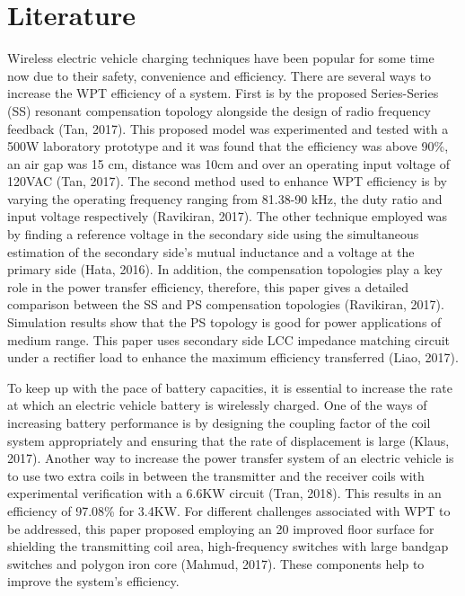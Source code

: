 \documentclass[12pt]{article}
\begin{document}
\section{Literature}
Wireless electric vehicle charging techniques have been popular for some time now due to their
safety, convenience and efficiency. There are several ways to increase the WPT efficiency of a system.
First is by the proposed Series-Series (SS) resonant compensation topology alongside the design of
radio frequency feedback (Tan, 2017). This proposed model was experimented and tested with a
500W laboratory prototype and it was found that the efficiency was above 90\%, an air gap was 15
cm, distance was 10cm and over an operating input voltage of 120VAC (Tan, 2017). The second
method used to enhance WPT efficiency is by varying the operating frequency ranging from 81.38-90 kHz, 
the duty ratio and input voltage respectively (Ravikiran, 2017). The other technique employed
was by finding a reference voltage in the secondary side using the simultaneous estimation of the
secondary side's mutual inductance and a voltage at the primary side (Hata, 2016). In addition, the
compensation topologies play a key role in the power transfer efficiency, therefore, this paper gives a
detailed comparison between the SS and PS compensation topologies (Ravikiran, 2017). Simulation
results show that the PS topology is good for power applications of medium range. This paper uses
secondary side LCC impedance matching circuit under a rectifier load to enhance the maximum
efficiency transferred (Liao, 2017).

To keep up with the pace of battery capacities, it is essential to increase the rate at which an
electric vehicle battery is wirelessly charged. One of the ways of increasing battery performance is
by designing the coupling factor of the coil system appropriately and ensuring that the rate of
displacement is large (Klaus, 2017). Another way to increase the power transfer system of an electric
vehicle is to use two extra coils in between the transmitter and the receiver coils with experimental
verification with a 6.6KW circuit (Tran, 2018). This results in an efficiency of 97.08\% for 3.4KW.
For different challenges associated with WPT to be addressed, this paper proposed employing an
20 improved floor surface for shielding the transmitting coil area, high-frequency switches with large
bandgap switches and polygon iron core (Mahmud, 2017). These components help to improve the
system's efficiency.
\end{document}
